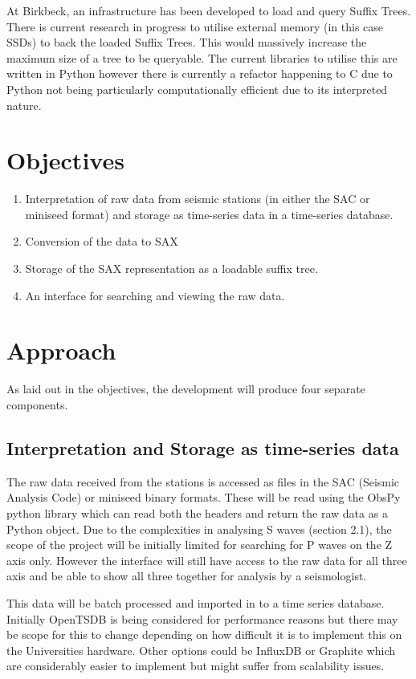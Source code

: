 \documentclass[11pt]{scrartcl}
\begin{document}
	At Birkbeck, an infrastructure has been developed to load and query Suffix Trees.  There is current research in progress to utilise external memory (in this case SSDs) to back the loaded Suffix Trees.  This would massively increase the maximum size of a tree to be queryable.  The current libraries to utilise this are written in Python however there is currently a refactor happening to C due to Python not being particularly computationally efficient due to its interpreted nature.

\section{Objectives}
\begin{enumerate}
	\item Interpretation of raw data from seismic stations (in either the SAC or miniseed format) and storage as time-series data in a time-series database.
	\item Conversion of the data to SAX
	\item Storage of the SAX representation as a loadable suffix tree.
	\item An interface for searching and viewing the raw data.
\end{enumerate}

\section{Approach}
	As laid out in the objectives, the development will produce four separate components.
	
\subsection{Interpretation and Storage as time-series data}
	The raw data received from the stations is accessed as files in the SAC (Seismic Analysis Code) or miniseed binary formats.  These will be read using the ObsPy python library which can read both the headers and return the raw data as a Python object.  Due to the complexities in analysing S waves (section 2.1), the scope of the project will be initially limited for searching for P waves on the Z axis only.  However the interface will still have access to the raw data for all three axis and be able to show all three together for analysis by a seismologist.
	
	This data will be batch processed and imported in to a time series database.  Initially OpenTSDB is being considered for performance reasons but there may be scope for this to change depending on how difficult it is to implement this on the Universities hardware.  Other options could be InfluxDB or Graphite which are considerably easier to implement but might suffer from scalability issues.
\end{document}

